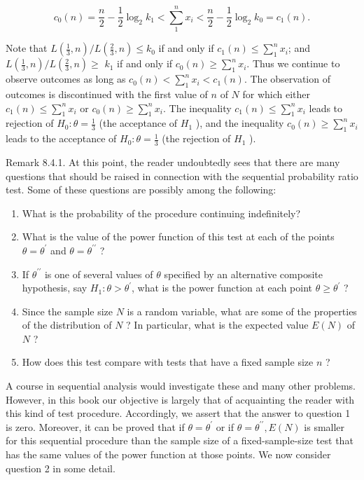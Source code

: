 $$
c_{0}(n)=\frac{n}{2}-\frac{1}{2} \log _{2} k_{1}<\sum_{1}^{n} x_{i}<\frac{n}{2}-\frac{1}{2} \log _{2} k_{0}=c_{1}(n) .
$$

Note that $L\left(\frac{1}{3}, n\right) / L\left(\frac{2}{3}, n\right) \leq k_{0}$ if and only if $c_{1}(n) \leq \sum_{1}^{n} x_{i}$; and $L\left(\frac{1}{3}, n\right) / L\left(\frac{2}{3}, n\right) \geq$ $k_{1}$ if and only if $c_{0}(n) \geq \sum_{1}^{n} x_{i}$. Thus we continue to observe outcomes as long as $c_{0}(n)<\sum_{1}^{n} x_{i}<c_{1}(n)$. The observation of outcomes is discontinued with the first value of $n$ of $N$ for which either $c_{1}(n) \leq \sum_{1}^{n} x_{i}$ or $c_{0}(n) \geq \sum_{1}^{n} x_{i}$. The inequality $c_{1}(n) \leq \sum_{1}^{n} x_{i}$ leads to rejection of $H_{0}: \theta=\frac{1}{3}$ (the acceptance of $H_{1}$ ), and the inequality $c_{0}(n) \geq \sum_{1}^{n} x_{i}$ leads to the acceptance of $H_{0}: \theta=\frac{1}{3}$ (the rejection of $H_{1}$ ).

Remark 8.4.1. At this point, the reader undoubtedly sees that there are many questions that should be raised in connection with the sequential probability ratio test. Some of these questions are possibly among the following:

\begin{enumerate}
  \item What is the probability of the procedure continuing indefinitely?
  \item What is the value of the power function of this test at each of the points $\theta=\theta^{\prime}$ and $\theta=\theta^{\prime \prime}$ ?
  \item If $\theta^{\prime \prime}$ is one of several values of $\theta$ specified by an alternative composite hypothesis, say $H_{1}: \theta>\theta^{\prime}$, what is the power function at each point $\theta \geq \theta^{\prime}$ ?
  \item Since the sample size $N$ is a random variable, what are some of the properties of the distribution of $N$ ? In particular, what is the expected value $E(N)$ of $N$ ?
  \item How does this test compare with tests that have a fixed sample size $n$ ?
\end{enumerate}

A course in sequential analysis would investigate these and many other problems. However, in this book our objective is largely that of acquainting the reader with this kind of test procedure. Accordingly, we assert that the answer to question 1 is zero. Moreover, it can be proved that if $\theta=\theta^{\prime}$ or if $\theta=\theta^{\prime \prime}, E(N)$ is smaller for this sequential procedure than the sample size of a fixed-sample-size test that has the same values of the power function at those points. We now consider question 2 in some detail.


